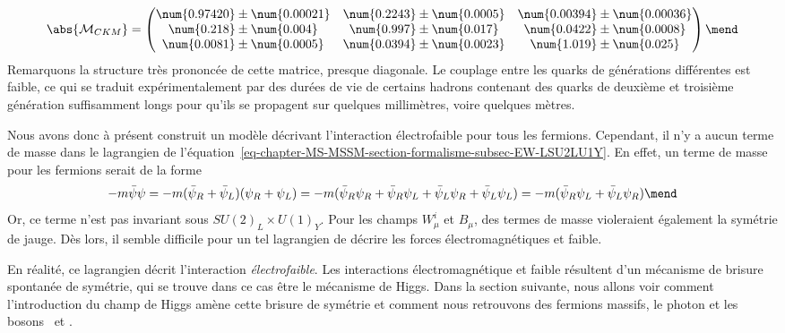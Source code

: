 \begin{equation}
\abs{\mathcal{M}_{CKM}} = 
\begin{pmatrix}
\num{0.97420}\pm\num{0.00021} & \num{0.2243}\pm\num{0.0005} & \num{0.00394}\pm\num{0.00036} \\
\num{0.218}\pm\num{0.004} & \num{0.997}\pm\num{0.017} & \num{0.0422}\pm\num{0.0008} \\
\num{0.0081}\pm\num{0.0005} & \num{0.0394}\pm\num{0.0023} & \num{1.019}\pm\num{0.025} 
\end{pmatrix}
\mend
\end{equation}
Remarquons la structure très prononcée de cette matrice, presque diagonale. Le couplage entre les quarks de générations différentes est faible, ce qui se traduit expérimentalement par des durées de vie de certains hadrons contenant des quarks de deuxième et troisième génération suffisamment longs pour qu'ils se propagent sur quelques millimètres, voire quelques mètres.
\par Nous avons donc à présent construit un modèle décrivant l'interaction électrofaible pour tous les fermions.
Cependant, il n'y a aucun terme de masse dans le lagrangien de l'équation~\eqref{eq-chapter-MS-MSSM-section-formalisme-subsec-EW-LSU2LU1Y}. En effet, un terme de masse pour les fermions serait de la forme
\begin{equation}
-m\bar{\psi}\psi
=
-m (\bar{\psi}_R+\bar{\psi}_L)(\psi_R+\psi_L)
=
-m (
\bar{\psi}_R \psi_R
+\bar{\psi}_R \psi_L
+\bar{\psi}_L \psi_R
+\bar{\psi}_L \psi_L
)
=
-m (\bar{\psi}_R \psi_L + \bar{\psi}_L \psi_R)
\mend
\end{equation}
Or, ce terme n'est pas invariant sous $SU(2)_L\times U(1)_Y$.
Pour les champs $W^i_\mu$ et $B_\mu$, des termes de masse violeraient également la symétrie de jauge.
Dès lors, il semble difficile pour un tel lagrangien de décrire les forces électromagnétiques et faible.
\par En réalité, ce lagrangien décrit l'interaction \emph{électrofaible}.
Les interactions électromagnétique et faible résultent d'un mécanisme de brisure spontanée de symétrie, qui se trouve dans ce cas être le mécanisme de Higgs.
Dans la section suivante, nous allons voir comment l'introduction du champ de Higgs amène cette brisure de symétrie et comment nous retrouvons des fermions massifs, le photon et les bosons \Wbosonpm\ et \Zboson.